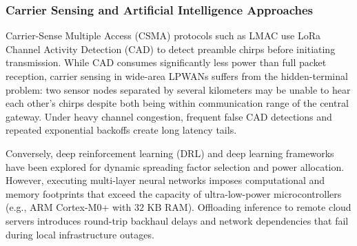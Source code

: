 \documentclass[preprint,review,12pt]{elsarticle}
\begin{document}
\subsubsection{Carrier Sensing and Artificial Intelligence Approaches}
Carrier-Sense Multiple Access (CSMA) protocols such as LMAC \cite{gamage2023lmac} use LoRa Channel Activity Detection (CAD) to detect preamble chirps before initiating transmission. While CAD consumes significantly less power than full packet reception, carrier sensing in wide-area LPWANs suffers from the hidden-terminal problem: two sensor nodes separated by several kilometers may be unable to hear each other's chirps despite both being within communication range of the central gateway. Under heavy channel congestion, frequent false CAD detections and repeated exponential backoffs create long latency tails.

Conversely, deep reinforcement learning (DRL) and deep learning frameworks \cite{leonardi2025deepadr} have been explored for dynamic spreading factor selection and power allocation. However, executing multi-layer neural networks imposes computational and memory footprints that exceed the capacity of ultra-low-power microcontrollers (e.g., ARM Cortex-M0+ with $32\text{ KB}$ RAM). Offloading inference to remote cloud servers introduces round-trip backhaul delays and network dependencies that fail during local infrastructure outages.
\end{document}

